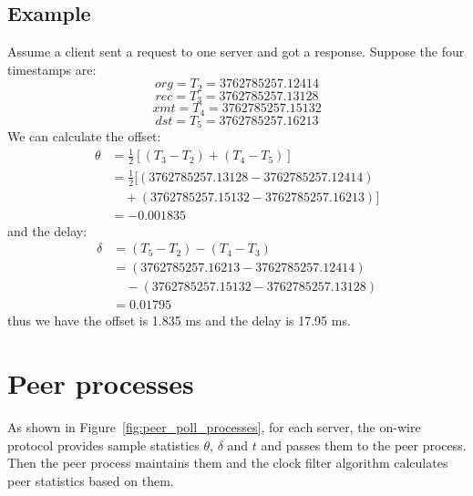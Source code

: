 \subsection{Example}%
\label{sub:example}
Assume a client sent a request to one server and got a response. Suppose the four
timestamps are:
$$
\textit{org} = T_2 = 3762785257.12414
$$
$$
\textit{rec} = T_3 = 3762785257.13128 
$$
$$
\textit{xmt} = T_4 = 3762785257.15132
$$
$$
\textit{dst} = T_5 = 3762785257.16213 
$$
We can calculate the offset:
\begin{align*}
\theta & = \frac{1}{2}\left[(T_3 - T_2) + (T_4 - T_5)\right]\\
       & = \frac{1}{2}[(3762785257.13128 - 3762785257.12414) \\
       & \quad + (3762785257.15132 - 3762785257.16213)]\\
       & = -0.001835
\end{align*}
and the delay:
\begin{align*}
\delta & = (T_5 - T_2) - (T_4 - T_3) \\
       & = (3762785257.16213 - 3762785257.12414) \\
       & \quad - (3762785257.15132 - 3762785257.13128) \\
       & = 0.01795
\end{align*}
thus we have the offset is 1.835 ms and the delay is 17.95 ms.

\section{Peer processes}%
\label{sec:peer_processes}
As shown in Figure~\ref{fig:peer_poll_processes}, 
for each server, the on-wire protocol provides sample statistics $\theta$,
$\delta$ and $t$ and passes them to the peer process. Then the peer process
maintains them and the clock filter algorithm calculates peer statistics based
on them.

